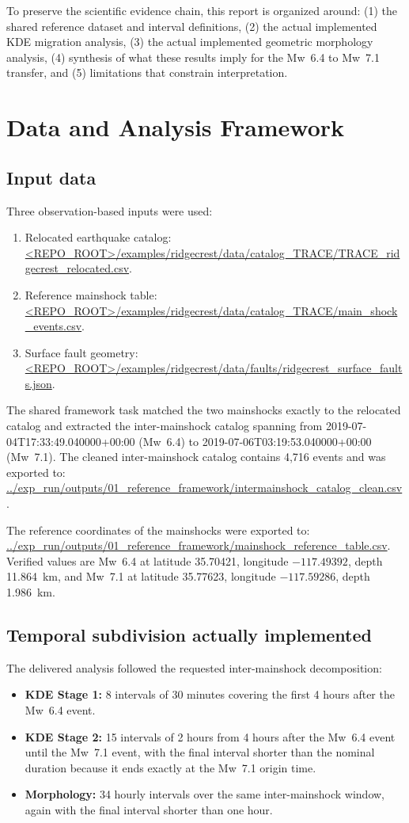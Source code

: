\documentclass[11pt]{article}
\begin{document}
To preserve the scientific evidence chain, this report is organized around: (1) the shared reference dataset and interval definitions, (2) the actual implemented KDE migration analysis, (3) the actual implemented geometric morphology analysis, (4) synthesis of what these results imply for the Mw~6.4 to Mw~7.1 transfer, and (5) limitations that constrain interpretation.

\section{Data and Analysis Framework}
\subsection{Input data}
Three observation-based inputs were used:
\begin{enumerate}[leftmargin=*]
    \item Relocated earthquake catalog: \url{<REPO_ROOT>/examples/ridgecrest/data/catalog_TRACE/TRACE_ridgecrest_relocated.csv}.
    \item Reference mainshock table: \url{<REPO_ROOT>/examples/ridgecrest/data/catalog_TRACE/main_shock_events.csv}.
    \item Surface fault geometry: \url{<REPO_ROOT>/examples/ridgecrest/data/faults/ridgecrest_surface_faults.json}.
\end{enumerate}

The shared framework task matched the two mainshocks exactly to the relocated catalog and extracted the inter-mainshock catalog spanning from 2019-07-04T17:33:49.040000+00:00 (Mw~6.4) to 2019-07-06T03:19:53.040000+00:00 (Mw~7.1). The cleaned inter-mainshock catalog contains 4,716 events and was exported to:
\url{../exp_run/outputs/01_reference_framework/intermainshock_catalog_clean.csv}.

The reference coordinates of the mainshocks were exported to:
\url{../exp_run/outputs/01_reference_framework/mainshock_reference_table.csv}.
Verified values are Mw~6.4 at latitude 35.70421, longitude $-117.49392$, depth 11.864~km, and Mw~7.1 at latitude 35.77623, longitude $-117.59286$, depth 1.986~km.

\subsection{Temporal subdivision actually implemented}
The delivered analysis followed the requested inter-mainshock decomposition:
\begin{itemize}[leftmargin=*]
    \item \textbf{KDE Stage 1:} 8 intervals of 30 minutes covering the first 4 hours after the Mw~6.4 event.
    \item \textbf{KDE Stage 2:} 15 intervals of 2 hours from 4 hours after the Mw~6.4 event until the Mw~7.1 event, with the final interval shorter than the nominal duration because it ends exactly at the Mw~7.1 origin time.
    \item \textbf{Morphology:} 34 hourly intervals over the same inter-mainshock window, again with the final interval shorter than one hour.
\end{itemize}
\end{document}
